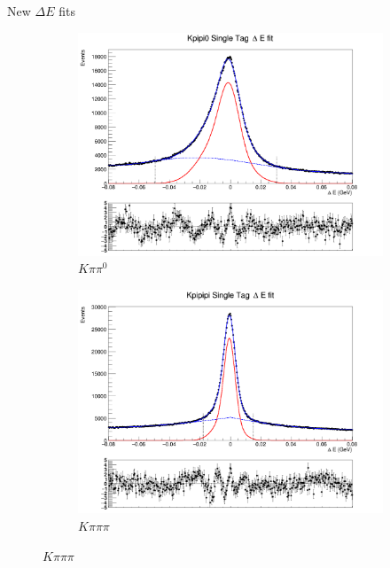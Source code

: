 \documentclass{beamer}
\begin{document}
\begin{frame}{New $\Delta E$ fits}
\begin{figure}
\begin{subfigure}{0.38\textwidth}
      \includegraphics[width=\textwidth]{Plots/Kpipi0_SingleTag_DeltaE_Plot.png}
      \caption{$K\pi\pi^0$}
    \end{subfigure}%
    \begin{subfigure}{0.38\textwidth}
      \centering
      \includegraphics[width=\textwidth]{Plots/Kpipipi_SingleTag_DeltaE_Plot.png}
      \caption{$K\pi\pi\pi$}
    \end{subfigure}
  \end{figure}
\end{frame}
\end{document}
